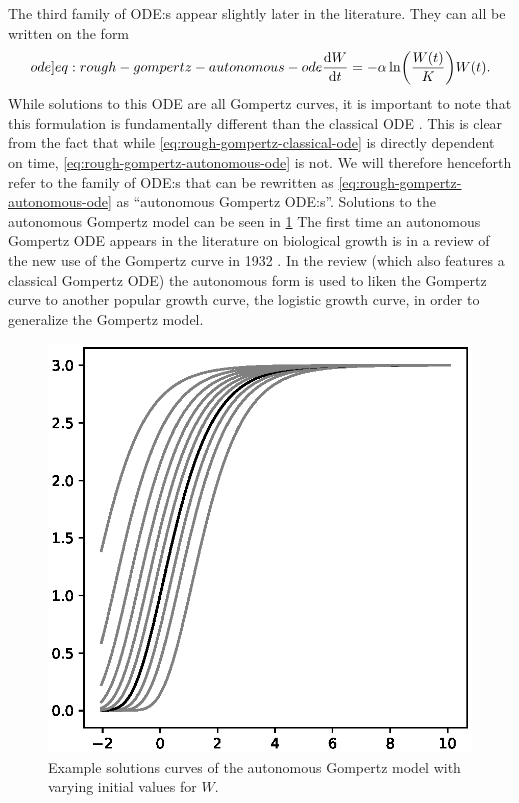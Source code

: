The third family of ODE:s appear slightly later in the literature.
They can all be written on the form
\begin{equation} \label[ode]{eq:rough-gompertz-autonomous-ode}
  \diff{W}{t} = -\alpha \ln\left(\frac{W(t)}{K}\right) W(t).
\end{equation}
While solutions to this ODE are all Gompertz curves, it is important to note that this formulation is fundamentally different than the classical ODE .
This is clear from the fact that while \cref{eq:rough-gompertz-classical-ode} is directly dependent on time, \cref{eq:rough-gompertz-autonomous-ode} is not.
We will therefore henceforth refer to the family of ODE:s that can be rewritten as \cref{eq:rough-gompertz-autonomous-ode} as \enquote{autonomous Gompertz ODE:s}.
Solutions to the autonomous Gompertz model can be seen in \cref{fig:gompertz-autonomous-solutions}
The first time an autonomous Gompertz ODE appears in the literature on biological growth is in a review of the new use of the Gompertz curve in 1932 \cite{winsor1932gompertz}.
In the review (which also features a classical Gompertz ODE) the autonomous form is used to liken the Gompertz curve to another popular growth curve, the logistic growth curve, in order to generalize the Gompertz model.
\begin{figure}
  \centering
  \includegraphics[width=.32\textwidth]{images/gompertz-autonomous-solutions}
  \caption{Example solutions curves of the autonomous Gompertz model with varying initial values for \(W\).}
  \label{fig:gompertz-autonomous-solutions}
\end{figure}

